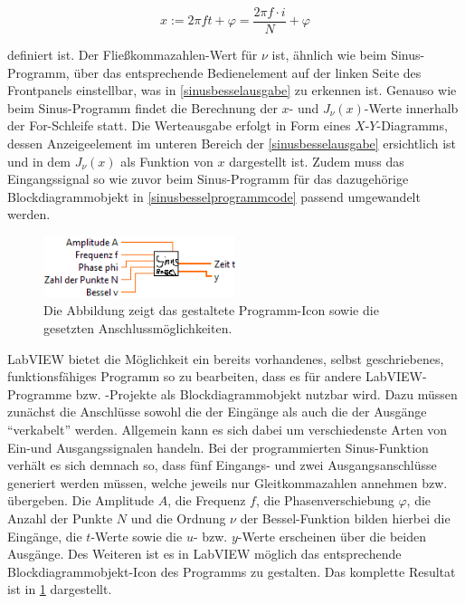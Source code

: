 \documentclass[
a4paper,
12pt,
pagesize,
ngerman
]{scrartcl}
\begin{document}
	\begin{equation}
	x := 2\pi f t + \varphi = \frac{2\pi f \cdot i}{N} + \varphi
	\end{equation}
	
	\noindent definiert ist. Der Fließkommazahlen-Wert für $\nu$ ist, ähnlich wie beim Sinus-Programm, über das entsprechende Bedienelement auf der linken Seite des Frontpanels einstellbar, was in \cref{sinusbesselausgabe} zu erkennen ist. Genauso wie beim Sinus-Programm findet die Berechnung der $x$- und $J_{\nu}(x)$-Werte innerhalb der For-Schleife statt. Die Werteausgabe erfolgt in Form eines $X$-$Y$-Diagramms, dessen Anzeigeelement im unteren Bereich der \cref{sinusbesselausgabe} ersichtlich ist und in dem $J_{\nu}(x)$ als Funktion von $x$ dargestellt ist. Zudem muss das Eingangssignal so wie zuvor beim Sinus-Programm für das dazugehörige Blockdiagrammobjekt in \cref{sinusbesselprogrammcode} passend umgewandelt werden.

	\begin{figure}[H]
		\centering
		\includegraphics[width=0.5\textwidth]{EIRE2018Dateien/Tag1/sinusbessel-bilder/SinusBesselc}
		\caption{Die Abbildung zeigt das gestaltete Programm-Icon sowie die gesetzten Anschlussmöglichkeiten.}
		\label{sinusbesselicon}
	\end{figure}
	
	\noindent LabVIEW bietet die Möglichkeit ein bereits vorhandenes, selbst geschriebenes, funktionsfähiges Programm so zu bearbeiten, dass es für andere LabVIEW-Programme bzw. -Projekte als Blockdiagrammobjekt nutzbar wird. Dazu müssen zunächst die Anschlüsse sowohl die der Eingänge als auch die der  Ausgänge \enquote{verkabelt} werden. Allgemein kann es sich dabei um verschiedenste Arten von Ein-und Ausgangssignalen handeln. Bei der programmierten Sinus-Funktion verhält es sich demnach so, dass fünf Eingangs- und zwei Ausgangsanschlüsse generiert werden müssen, welche jeweils nur Gleitkommazahlen annehmen bzw. übergeben. Die Amplitude $A$, die Frequenz $f$, die Phasenverschiebung $\varphi$, die Anzahl der Punkte $N$ und die Ordnung $\nu$ der Bessel-Funktion bilden hierbei die Eingänge, die $t$-Werte sowie die $u$- bzw. $y$-Werte erscheinen über die beiden Ausgänge. Des Weiteren ist es in LabVIEW möglich das entsprechende Blockdiagrammobjekt-Icon des Programms zu gestalten. Das komplette Resultat ist in \cref{sinusbesselicon} dargestellt.
	
\end{document}

